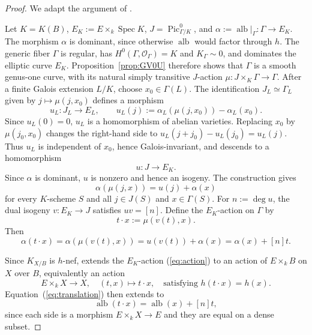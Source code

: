 \documentclass[10pt,abstract=true]{scrartcl}
\numberwithin{equation}{section}
\theoremstyle{definition}
\theoremstyle{remark}
\DeclareMathOperator\alb{alb}
\DeclareMathOperator\Pic{Pic}
\begin{document}
\begin{proof}
  We adapt the argument of \cite[\S3, pp.~34--35]{BM-II}.

  Let $K=K(B)$, $E_K:=E\times_k\operatorname{Spec}K$, $J=\Pic^0_{\Gamma/K}$, and $\alpha:=\alb|_\Gamma\colon\Gamma\to E_K$.
  The morphism $\alpha$ is dominant, since otherwise $\alb$ would factor through $h$.
  The generic fiber $\Gamma$ is regular, has $H^0(\Gamma,\mathcal O_\Gamma)=K$ and $K_\Gamma\sim0$, and dominates the elliptic curve $E_K$.
  Proposition~\ref{prop:GV0U} therefore shows that $\Gamma$ is a smooth genus-one curve, with its natural simply transitive $J$-action $\mu\colon J\times_K\Gamma\longrightarrow\Gamma$.
  After a finite Galois extension $L/K$, choose $x_0\in\Gamma(L)$.
  The identification $J_L\simeq\Gamma_L$ given by $j\mapsto\mu(j,x_0)$ defines a morphism
  \[
    u_L\colon J_L\longrightarrow E_L,\qquad
    u_L(j):=\alpha_L(\mu(j,x_0))-\alpha_L(x_0).
  \]
  Since \(u_L(0)=0\), \(u_L\) is a homomorphism of abelian varieties.
  Replacing $x_0$ by $\mu(j_0,x_0)$ changes the right-hand side to $u_L(j + j_0) - u_L(j_0) = u_L(j)$.
  Thus $u_L$ is independent of $x_0$, hence Galois-invariant, and descends to a homomorphism
  \[
    u\colon J\to E_K .
  \]
  Since $\alpha$ is dominant, $u$ is nonzero and hence an isogeny.
  The construction gives \[
    \alpha(\mu(j,x))=u(j)+\alpha(x)
  \]
  for every $K$-scheme $S$ and all $j\in J(S)$ and $x\in\Gamma(S)$.
  For $n:=\deg u$, the dual isogeny $v\colon E_K\to J$ satisfies $uv=[n]$.
  Define the $E_K$-action on $\Gamma$ by
  \begin{equation}\label{eq:action}
    t\cdot x:=\mu(v(t),x)
  .
  \end{equation}
  Then
  \begin{equation}\label{eq:translation}
    \alpha(t\cdot x)=\alpha(\mu(v(t),x))
    =u(v(t))+\alpha(x)=\alpha(x) + [n]t.
  \end{equation}

  Since $K_{X/B}$ is $h$-nef, \cite[Theorem~7]{Kollar-2025-birational-actions} extends the $E_K$-action (\ref{eq:action}) to an action of $E\times_kB$ on $X$ over $B$, equivalently an action
  \[
    E\times_kX\longrightarrow X,\quad (t,x)\longmapsto t\cdot x, \quad\text{satisfying  }h(t\cdot x)=h(x).
  \]
  Equation~(\ref{eq:translation}) then extends to 
  \begin{equation}\label{eq:second-fibration-equivariance}
    \alb(t\cdot x)=\alb(x)+[n]t,
  \end{equation}
  since each side is a morphism $E\times_kX\to E$ and they are equal on a dense subset.


\end{proof}
\end{document}
